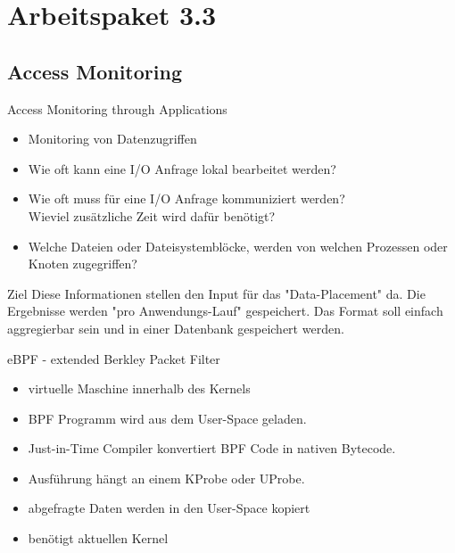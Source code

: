 \section{Arbeitspaket 3.3}

\subsection{Access Monitoring}

\begin{frame}{Access Monitoring through Applications}
    \begin{itemize}
        \item Monitoring von Datenzugriffen
        \item Wie oft kann eine I/O Anfrage lokal bearbeitet werden?
        \item Wie oft muss f\"{u}r eine I/O Anfrage kommuniziert werden?\\
            Wieviel zus\"{a}tzliche Zeit wird daf\"{u}r ben\"{o}tigt?
        \item Welche Dateien oder Dateisystembl\"{o}cke, werden
            von welchen Prozessen oder Knoten zugegriffen?
    \end{itemize}
    \begin{block}{Ziel}
        Diese Informationen stellen den Input f\"{u}r das "Data-Placement" da.
        Die Ergebnisse werden "pro Anwendungs-Lauf" gespeichert.
        Das Format soll einfach aggregierbar sein und in einer Datenbank gespeichert
        werden.
    \end{block}
\end{frame}


\begin{frame}{eBPF - extended Berkley Packet Filter}
    \begin{itemize}
        \item virtuelle Maschine innerhalb des Kernels
        \item BPF Programm wird aus dem User-Space geladen.
        \item Just-in-Time Compiler konvertiert BPF Code in nativen Bytecode.
        \item Ausf\"{u}hrung h\"{a}ngt an einem KProbe oder UProbe.
        \item abgefragte Daten werden in den User-Space kopiert
        \item ben\"{o}tigt aktuellen Kernel
    \end{itemize}
\end{frame}

